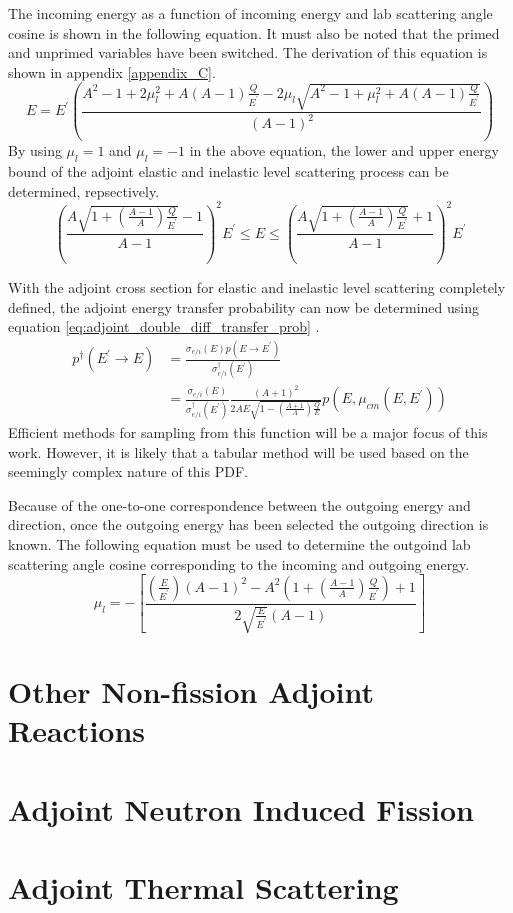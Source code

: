 The incoming energy as a function of incoming energy and lab scattering angle
cosine is shown in the following equation. It must also be noted that the
primed and unprimed variables have been switched. The derivation of this 
equation is shown in appendix \ref{appendix_C}.
\begin{equation}
  E = E^{'}\left(\frac{A^2-1+2\mu_l^2 + A(A-1)\frac{Q}{E^{'}} - 
    2\mu_l\sqrt{A^2 - 1 + \mu_l^2 + A(A-1)\frac{Q}{E^{'}}}}{(A-1)^2}
  \right)
\end{equation}
By using $\mu_l = 1$ and $\mu_l = -1$ in the above equation, the lower and
upper energy bound of the adjoint elastic and inelastic level scattering
process can be determined, repsectively.
\begin{equation}
  \left(\frac{A\sqrt{1+\left(\frac{A-1}{A}\right)\frac{Q}{E^{'}}}-1}{A-1}
  \right)^2 E^{'} \leq E \leq
  \left(\frac{A\sqrt{1+\left(\frac{A-1}{A}\right)\frac{Q}{E^{'}}}+1}{A-1}
  \right)^2 E^{'}
\end{equation}

With the adjoint cross section for elastic and inelastic level scattering
completely defined, the adjoint energy transfer probability can now be 
determined using equation \ref{eq:adjoint_double_diff_transfer_prob}
\citep{hoogenboom_adjoint_1977}.
\begin{align}
  p^{\dagger}(E^{'} \to E) & = \frac{\sigma_{e/i}(E)p(E \to E^{'})}
  {\sigma_{e/i}^{\dagger}(E^{'})} \nonumber \\
    & = \frac{\sigma_{e/i}(E)}{\sigma_{e/i}^{\dagger}(E^{'})}
  \frac{(A+1)^2}{2AE\sqrt{1-\left(\frac{A+1}{A}\right)\frac{Q}{E}}}
  p(E, \mu_{cm}(E,E^{'})) 
\end{align}
Efficient methods for sampling from this function will be a major focus of this
work. However, it is likely that a tabular method will be used based on the
seemingly complex nature of this PDF.

Because of the one-to-one correspondence between the outgoing energy and
direction, once the outgoing energy has been selected the outgoing direction
is known. The following equation must be used to determine the outgoind
lab scattering angle cosine corresponding to the incoming and outgoing energy.
\begin{equation}
  \mu_l = - \left[\frac{\left(\frac{E}{E^{'}}\right)(A-1)^2 - 
      A^2\left(1+\left(\frac{A-1}{A}\right)\frac{Q}{E^{'}}\right) + 1}
    {2\sqrt{\frac{E}{E^{'}}}(A-1)}\right]
\end{equation}

\section{Other Non-fission Adjoint  Reactions}

\section{Adjoint Neutron Induced Fission}

\section{Adjoint Thermal Scattering}


